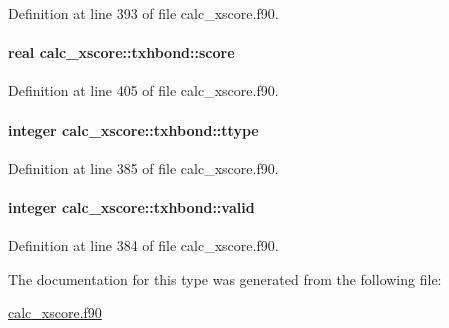 Definition at line 393 of file calc\-\_\-xscore.\-f90.

\hypertarget{structcalc__xscore_1_1txhbond_ad2113b3edb440b395e87407baca90a29}{
\paragraph[{score}]{\setlength{\rightskip}{0pt plus 5cm}real calc\-\_\-xscore\-::txhbond\-::score}}\label{structcalc__xscore_1_1txhbond_ad2113b3edb440b395e87407baca90a29}


Definition at line 405 of file calc\-\_\-xscore.\-f90.

\hypertarget{structcalc__xscore_1_1txhbond_a4d2b590837def57b6fe2fd16ec010760}{
\paragraph[{ttype}]{\setlength{\rightskip}{0pt plus 5cm}integer calc\-\_\-xscore\-::txhbond\-::ttype}}\label{structcalc__xscore_1_1txhbond_a4d2b590837def57b6fe2fd16ec010760}


Definition at line 385 of file calc\-\_\-xscore.\-f90.

\hypertarget{structcalc__xscore_1_1txhbond_a0e458ce73a92ab93b106877433606452}{
\paragraph[{valid}]{\setlength{\rightskip}{0pt plus 5cm}integer calc\-\_\-xscore\-::txhbond\-::valid}}\label{structcalc__xscore_1_1txhbond_a0e458ce73a92ab93b106877433606452}


Definition at line 384 of file calc\-\_\-xscore.\-f90.



The documentation for this type was generated from the following file\-:\begin{DoxyCompactItemize}
\item 
\hyperlink{calc__xscore_8f90}{calc\-\_\-xscore.\-f90}\end{DoxyCompactItemize}
